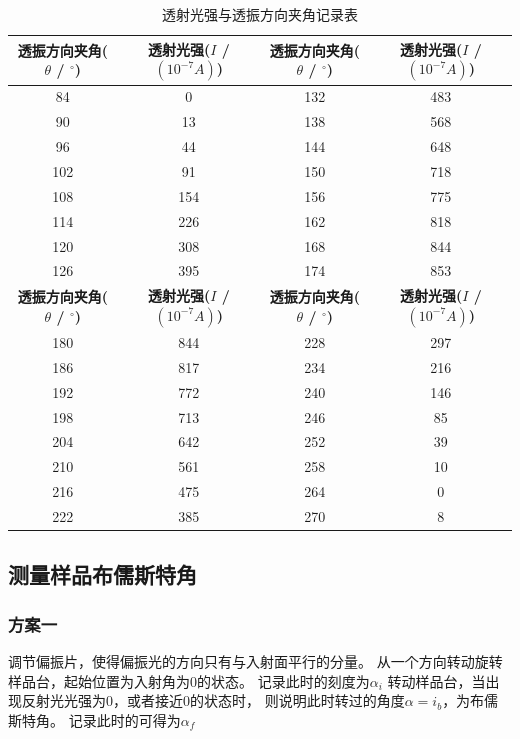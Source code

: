 \documentclass[a4paper,UTF8]{ctexart}
\begin{document}
\begin{table}[htb]
\begin{tabular}{|c|c|c|c|}
\hline
\bfseries 透振方向夹角($\theta$ / $^\circ$) & \bfseries 透射光强($I$ / $(10^{-7}A)$) & \bfseries 透振方向夹角($\theta$ / $^\circ$) & \bfseries 透射光强($I$ / $(10^{-7}A)$) \\ \hline
84  & 0   & 132 & 483 \\ \hline
90  & 13  & 138 & 568 \\ \hline
96  & 44  & 144 & 648 \\ \hline
102 & 91  & 150 & 718 \\ \hline
108 & 154 & 156 & 775 \\ \hline
114 & 226 & 162 & 818 \\ \hline
120 & 308 & 168 & 844 \\ \hline
126 & 395 & 174 & 853 \\ \hline

\bfseries 透振方向夹角($\theta$ / $^\circ$) & \bfseries 透射光强($I$ / $(10^{-7}A)$) & \bfseries 透振方向夹角($\theta$ / $^\circ$) & \bfseries 透射光强($I$ / $(10^{-7}A)$) \\ \hline

180 & 844 & 228 & 297 \\ \hline
186 & 817 & 234 & 216 \\ \hline
192 & 772 & 240 & 146 \\ \hline
198 & 713 & 246 & 85  \\ \hline
204 & 642 & 252 & 39  \\ \hline
210 & 561 & 258 & 10  \\ \hline
216 & 475 & 264 & 0   \\ \hline
222 & 385 & 270 & 8   \\ \hline
\end{tabular}
\caption{透射光强与透振方向夹角记录表}
\end{table}

\subsection{测量样品布儒斯特角}

\subsubsection{方案一}

调节偏振片，使得偏振光的方向只有与入射面平行的分量。
从一个方向转动旋转样品台，起始位置为入射角为0的状态。
记录此时的刻度为$\alpha_i$
转动样品台，当出现反射光光强为0，或者接近0的状态时，
则说明此时转过的角度$\alpha = i_b$，为布儒斯特角。
记录此时的可得为$\alpha_f$
\end{document}
